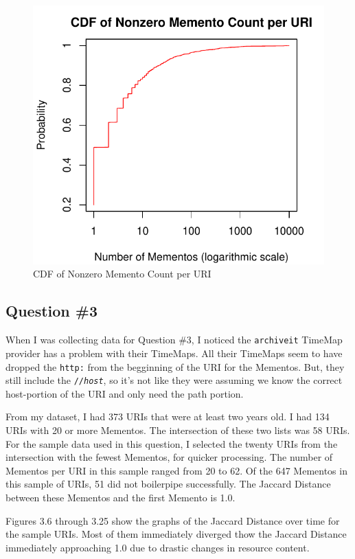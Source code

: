 \documentclass[a4paper,12pt]{article}
\begin{document}
\begin{figure}[H]
    \centering
    \includegraphics{stats/memento_counts_nonzero.pdf}
    \caption{CDF of Nonzero Memento Count per URI}
\end{figure}

\subsection{Question \#3}
When I was collecting data for Question \#3, I noticed the \texttt{archiveit} TimeMap provider has a problem
with their TimeMaps. All their TimeMaps seem to have dropped the \texttt{http:} from the begginning of the
URI for the Mementos. But, they still include the \texttt{//\emph{host}}, so it's not like they were
assuming we know the correct host-portion of the URI and only need the path portion.

From my dataset, I had 373 URIs that were at least two years old. I had 134 URIs with 20 or more Mementos.
The intersection of these two lists was 58 URIs. For the sample data used in this question, I selected
the twenty URIs from the intersection with the fewest Mementos, for quicker processing. The number of
Mementos per URI in this sample ranged from 20 to 62. Of the 647 Mementos in this sample of URIs, 51
did not boilerpipe successfully. The Jaccard Distance between these Mementos and the first Memento is 1.0.

Figures 3.6 through 3.25 show the graphs of the Jaccard Distance over time for the sample URIs. Most of
them immediately diverged thow the Jaccard Distance immediately approaching 1.0 due to drastic changes in
resource content.
\end{document}
